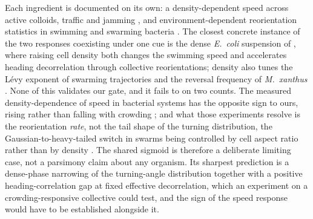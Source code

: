 \documentclass[11pt,a4paper]{article}
\begin{document}
Each ingredient is documented on its own: a density-dependent
speed across active colloids, traffic and jamming
\citep{CatesTailleur2015, Greenshields, Bi2016, Angelini2011},
and environment-dependent reorientation statistics in swimming
and swarming bacteria \citep{Korobkova2004, Dieterich2008,
Berg1972}. The closest concrete instance of the two responses
coexisting under one cue is the dense \emph{E.~coli} suspension of
\citet{Colin2019}, where raising cell density both changes the
swimming speed and accelerates heading decorrelation through
collective reorientations; density also tunes the L\'evy exponent
of swarming trajectories \citep{Beer2020} and the reversal
frequency of \emph{M.~xanthus} \citep{Shi1996}. None of this
validates our gate, and it fails to on two counts. The measured
density-dependence of speed in bacterial systems has the opposite
sign to ours, rising rather than falling with crowding
\citep{Colin2019, Beer2020}; and what those experiments resolve is
the reorientation \emph{rate}, not the tail shape of the turning
distribution, the Gaussian-to-heavy-tailed switch in swarms being
controlled by cell aspect ratio rather than by density
\citep{Ilkanaiv2017, Beer2020}. The shared sigmoid is therefore a
deliberate limiting case, not a parsimony claim about any
organism. Its sharpest prediction is a dense-phase narrowing of
the turning-angle distribution together with a positive
heading-correlation gap at fixed effective decorrelation, which an
experiment on a crowding-responsive collective could test, and the
sign of the speed response would have to be established alongside
it.
\end{document}
